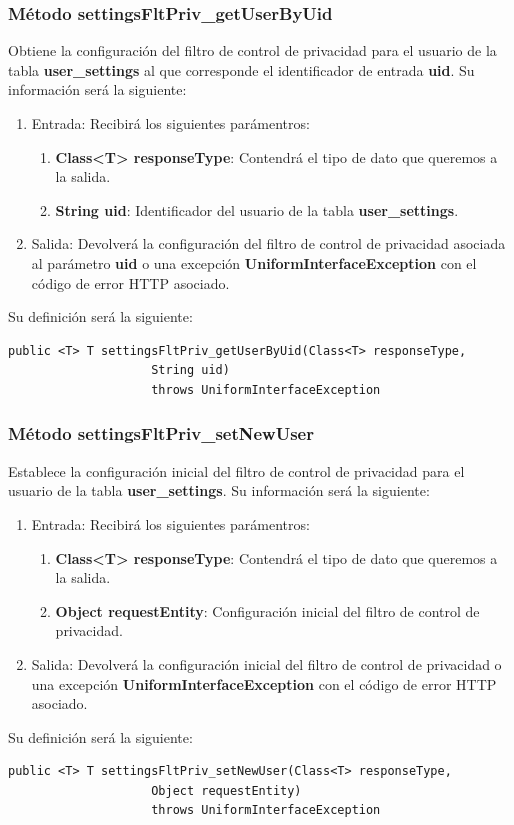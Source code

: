 \subsubsection{Método settingsFltPriv\_getUserByUid}
Obtiene la configuración del filtro de control de privacidad para el usuario de la tabla \textbf{user\_settings} al que corresponde el identificador de entrada \textbf{uid}. Su información será la siguiente:
\begin{enumerate}
\item Entrada: Recibirá los siguientes parámentros:
\begin{enumerate}
\item \textbf{Class<T> responseType}: Contendrá el tipo de dato que queremos a la salida. 
\item \textbf{String uid}: Identificador del usuario de la tabla \textbf{user\_settings}.
\end{enumerate}
\item Salida: Devolverá la configuración del filtro de control de privacidad asociada al parámetro \textbf{uid} o una excepción \textbf{UniformInterfaceException} con el código de error HTTP asociado.
\end{enumerate}
\bigskip
\par
Su definición será la siguiente:
\begin{verbatim}public <T> T settingsFltPriv_getUserByUid(Class<T> responseType, 
					String uid) 
					throws UniformInterfaceException\end{verbatim}

\subsubsection{Método settingsFltPriv\_setNewUser}
Establece la configuración inicial del filtro de control de privacidad para el usuario de la tabla \textbf{user\_settings}. Su información será la siguiente:
\begin{enumerate}
\item Entrada: Recibirá los siguientes parámentros:
\begin{enumerate}
\item \textbf{Class<T> responseType}: Contendrá el tipo de dato que queremos a la salida. 
\item \textbf{Object requestEntity}: Configuración inicial del filtro de control de privacidad.
\end{enumerate}
\item Salida: Devolverá la configuración inicial del filtro de control de privacidad o una excepción \textbf{UniformInterfaceException} con el código de error HTTP asociado.
\end{enumerate}
\bigskip
\par
Su definición será la siguiente:
\begin{verbatim}public <T> T settingsFltPriv_setNewUser(Class<T> responseType, 
					Object requestEntity) 
					throws UniformInterfaceException\end{verbatim}


